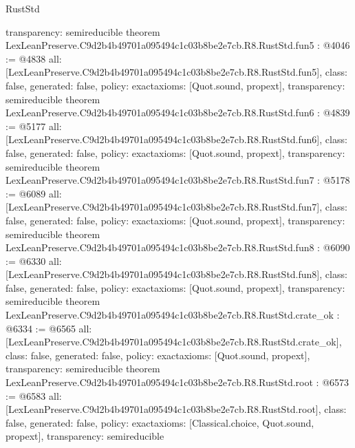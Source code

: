 \begin{lexlean}{RustStd}
\begin{coremodule}
{  transparency: semireducible
}
theorem LexLeanPreserve.C9d2b4b49701a095494c1c03b8be2e7cb.R8.RustStd.fun5 : @4046 := @4838 {
  all: [LexLeanPreserve.C9d2b4b49701a095494c1c03b8be2e7cb.R8.RustStd.fun5],
  class: false,
  generated: false,
  policy: exact{axioms: [Quot.sound, propext]},
  transparency: semireducible
}
theorem LexLeanPreserve.C9d2b4b49701a095494c1c03b8be2e7cb.R8.RustStd.fun6 : @4839 := @5177 {
  all: [LexLeanPreserve.C9d2b4b49701a095494c1c03b8be2e7cb.R8.RustStd.fun6],
  class: false,
  generated: false,
  policy: exact{axioms: [Quot.sound, propext]},
  transparency: semireducible
}
theorem LexLeanPreserve.C9d2b4b49701a095494c1c03b8be2e7cb.R8.RustStd.fun7 : @5178 := @6089 {
  all: [LexLeanPreserve.C9d2b4b49701a095494c1c03b8be2e7cb.R8.RustStd.fun7],
  class: false,
  generated: false,
  policy: exact{axioms: [Quot.sound, propext]},
  transparency: semireducible
}
theorem LexLeanPreserve.C9d2b4b49701a095494c1c03b8be2e7cb.R8.RustStd.fun8 : @6090 := @6330 {
  all: [LexLeanPreserve.C9d2b4b49701a095494c1c03b8be2e7cb.R8.RustStd.fun8],
  class: false,
  generated: false,
  policy: exact{axioms: [Quot.sound, propext]},
  transparency: semireducible
}
theorem LexLeanPreserve.C9d2b4b49701a095494c1c03b8be2e7cb.R8.RustStd.crate_ok : @6334 := @6565 {
  all: [LexLeanPreserve.C9d2b4b49701a095494c1c03b8be2e7cb.R8.RustStd.crate_ok],
  class: false,
  generated: false,
  policy: exact{axioms: [Quot.sound, propext]},
  transparency: semireducible
}
theorem LexLeanPreserve.C9d2b4b49701a095494c1c03b8be2e7cb.R8.RustStd.root : @6573 := @6583 {
  all: [LexLeanPreserve.C9d2b4b49701a095494c1c03b8be2e7cb.R8.RustStd.root],
  class: false,
  generated: false,
  policy: exact{axioms: [Classical.choice, Quot.sound, propext]},
  transparency: semireducible
}


\end{coremodule}
\end{lexlean}
